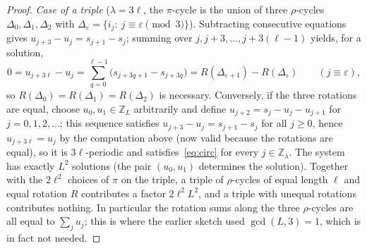 \documentclass[preprint,12pt]{elsarticle}
\theoremstyle{definition}\newtheorem{defi}[thm]{Definition}\newtheorem{prob}[thm]{Problem}\newtheorem{obs}[thm]{Observation}
\theoremstyle{remark}\newtheorem{rem}[thm]{Remark}
\newcommand{\ZZ}{\mathbb Z}\newcommand{\Sym}{\operatorname{Sym}}\newcommand{\Alt}{\operatorname{Alt}}
\begin{document}
\begin{proof}
\emph{Case of a triple} ($\lambda=3\ell$, the $\pi$-cycle is the union of three $\rho$-cycles $\Delta_0,\Delta_1,\Delta_2$ with $\Delta_\varepsilon=\{i_j:\ j\equiv\varepsilon\pmod 3\}$). Subtracting consecutive equations gives $u_{j+3}-u_j=s_{j+1}-s_j$; summing over $j,j+3,\ldots,j+3(\ell-1)$ yields, for a solution,
\[
0=u_{j+3\ell}-u_j=\sum_{q=0}^{\ell-1}\bigl(s_{j+3q+1}-s_{j+3q}\bigr)=R(\Delta_{\varepsilon+1})-R(\Delta_{\varepsilon})\qquad(j\equiv\varepsilon),
\]
so $R(\Delta_0)=R(\Delta_1)=R(\Delta_2)$ is necessary. Conversely, if the three rotations are equal, choose $u_0,u_1\in\ZZ_L$ arbitrarily and define $u_{j+2}=s_j-u_j-u_{j+1}$ for $j=0,1,2,\ldots$; this sequence satisfies $u_{j+3}-u_j=s_{j+1}-s_j$ for all $j\ge0$, hence $u_{j+3\ell}=u_j$ by the computation above (now valid because the rotations are equal), so it is $3\ell$-periodic and satisfies~\eqref{eq:circ} for every $j\in\ZZ_\lambda$. The system has exactly $L^{2}$ solutions (the pair $(u_0,u_1)$ determines the solution). Together with the $2\ell^{2}$ choices of $\pi$ on the triple, a triple of $\rho$-cycles of equal length $\ell$ and equal rotation $R$ contributes a factor $2\ell^{2}L^{2}$, and a triple with unequal rotations contributes nothing. In particular the rotation sums along the three $\rho$-cycles are all equal to $\sum_j u_j$; this is where the earlier sketch used $\gcd(L,3)=1$, which is in fact not needed.


\end{proof}
\end{document}
